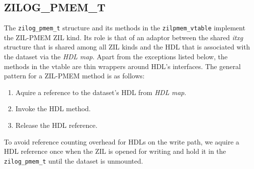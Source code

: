 \documentclass[12pt,a4paper,twoside]{book}
\begin{document}
\subsection{ZILOG\_PMEM\_T}\label{sec:zilpmem:zilog}
The \lstinline{zilog_pmem_t} structure and its methods in the \lstinline{zilpmem_vtable} implement the ZIL-PMEM ZIL kind.
Its role is that of an adaptor between the shared \textit{itxg} structure that is shared among all ZIL kinds and the HDL that is associated with the dataset via the \textit{HDL map}.
Apart from the exceptions listed below, the methods in the vtable are thin wrappers around HDL's interfaces.
The general pattern for a ZIL-PMEM method is as follows:
\begin{enumerate}[noitemsep]
    \item Aquire a reference to the dataset's HDL from \textit{HDL map}.
    \item Invoke the HDL method.
    \item Release the HDL reference.
\end{enumerate}
To avoid reference counting overhead for HDLs on the write path, we aquire a HDL reference once when the ZIL is opened for writing and hold it in the \lstinline{zilog_pmem_t} until the dataset is unmounted.
\end{document}
